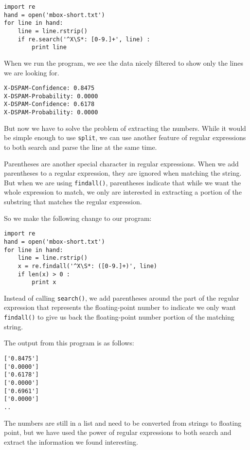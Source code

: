 \beforeverb
\begin{verbatim}
import re
hand = open('mbox-short.txt')
for line in hand:
    line = line.rstrip()
    if re.search('^X\S*: [0-9.]+', line) :
        print line
\end{verbatim}
\afterverb
%
When we run the program, we see the data nicely filtered to show
only the lines we are looking for.

\beforeverb
\begin{verbatim}
X-DSPAM-Confidence: 0.8475
X-DSPAM-Probability: 0.0000
X-DSPAM-Confidence: 0.6178
X-DSPAM-Probability: 0.0000
\end{verbatim}
\afterverb
%
But now we have to solve the problem of extracting the numbers.  While it would be simple
enough to use {\tt split}, we can use another feature of regular expressions to both search
and parse the line at the same time.

Parentheses are another special character in regular expressions.  When we add parentheses
to a regular expression, they are ignored when matching the string. But when we are using
{\tt findall()}, parentheses indicate that while we want the whole expression to match,
we only are interested in extracting a portion of the substring that matches the regular
expression.

So we make the following change to our program:

\beforeverb
\begin{verbatim}
import re
hand = open('mbox-short.txt')
for line in hand:
    line = line.rstrip()
    x = re.findall('^X\S*: ([0-9.]+)', line)
    if len(x) > 0 :
        print x
\end{verbatim}
\afterverb
%
Instead of calling {\tt search()}, we add parentheses around the part of the regular expression
that represents the floating-point number to indicate we only want {\tt findall()} to give us
back the floating-point number portion of the matching string.

The output from this program is as follows:

\beforeverb
\begin{verbatim}
['0.8475']
['0.0000']
['0.6178']
['0.0000']
['0.6961']
['0.0000']
..
\end{verbatim}
\afterverb
%
The numbers are still in a list and need to be converted from strings to floating point, but we
have used the power of regular expressions to both search and extract the information we found
interesting.

